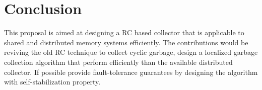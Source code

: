 \section{Conclusion}
This proposal is aimed at designing a RC based collector that is applicable to
 shared and distributed memory systems efficiently. The contributions would be
 reviving the old RC technique to collect cyclic garbage, design a localized 
 garbage collection algorithm that perform efficiently than the available distributed
 collector. If possible provide fault-tolerance guarantees by designing the
 algorithm with self-stabilization property.
